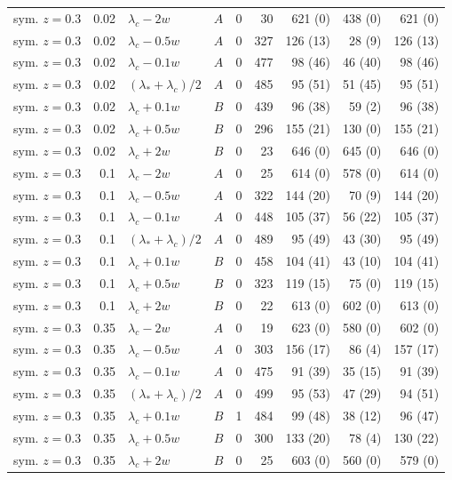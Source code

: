 \begin{longtable}{@{}lrllrrrrr@{}}
sym. $z{=}0.3$ & 0.02 & $\lambda_c-2w$ & $A$ & 0 & 30 & 621 (0) & 438 (0) & 621 (0)\\
sym. $z{=}0.3$ & 0.02 & $\lambda_c-0.5w$ & $A$ & 0 & 327 & 126 (13) & 28 (9) & 126 (13)\\
sym. $z{=}0.3$ & 0.02 & $\lambda_c-0.1w$ & $A$ & 0 & 477 & 98 (46) & 46 (40) & 98 (46)\\
sym. $z{=}0.3$ & 0.02 & $(\lambda_*+\lambda_c)/2$ & $A$ & 0 & 485 & 95 (51) & 51 (45) & 95 (51)\\
sym. $z{=}0.3$ & 0.02 & $\lambda_c+0.1w$ & $B$ & 0 & 439 & 96 (38) & 59 (2) & 96 (38)\\
sym. $z{=}0.3$ & 0.02 & $\lambda_c+0.5w$ & $B$ & 0 & 296 & 155 (21) & 130 (0) & 155 (21)\\
sym. $z{=}0.3$ & 0.02 & $\lambda_c+2w$ & $B$ & 0 & 23 & 646 (0) & 645 (0) & 646 (0)\\
sym. $z{=}0.3$ & 0.1 & $\lambda_c-2w$ & $A$ & 0 & 25 & 614 (0) & 578 (0) & 614 (0)\\
sym. $z{=}0.3$ & 0.1 & $\lambda_c-0.5w$ & $A$ & 0 & 322 & 144 (20) & 70 (9) & 144 (20)\\
sym. $z{=}0.3$ & 0.1 & $\lambda_c-0.1w$ & $A$ & 0 & 448 & 105 (37) & 56 (22) & 105 (37)\\
sym. $z{=}0.3$ & 0.1 & $(\lambda_*+\lambda_c)/2$ & $A$ & 0 & 489 & 95 (49) & 43 (30) & 95 (49)\\
sym. $z{=}0.3$ & 0.1 & $\lambda_c+0.1w$ & $B$ & 0 & 458 & 104 (41) & 43 (10) & 104 (41)\\
sym. $z{=}0.3$ & 0.1 & $\lambda_c+0.5w$ & $B$ & 0 & 323 & 119 (15) & 75 (0) & 119 (15)\\
sym. $z{=}0.3$ & 0.1 & $\lambda_c+2w$ & $B$ & 0 & 22 & 613 (0) & 602 (0) & 613 (0)\\
sym. $z{=}0.3$ & 0.35 & $\lambda_c-2w$ & $A$ & 0 & 19 & 623 (0) & 580 (0) & 602 (0)\\
sym. $z{=}0.3$ & 0.35 & $\lambda_c-0.5w$ & $A$ & 0 & 303 & 156 (17) & 86 (4) & 157 (17)\\
sym. $z{=}0.3$ & 0.35 & $\lambda_c-0.1w$ & $A$ & 0 & 475 & 91 (39) & 35 (15) & 91 (39)\\
sym. $z{=}0.3$ & 0.35 & $(\lambda_*+\lambda_c)/2$ & $A$ & 0 & 499 & 95 (53) & 47 (29) & 94 (51)\\
sym. $z{=}0.3$ & 0.35 & $\lambda_c+0.1w$ & $B$ & 1 & 484 & 99 (48) & 38 (12) & 96 (47)\\
sym. $z{=}0.3$ & 0.35 & $\lambda_c+0.5w$ & $B$ & 0 & 300 & 133 (20) & 78 (4) & 130 (22)\\
sym. $z{=}0.3$ & 0.35 & $\lambda_c+2w$ & $B$ & 0 & 25 & 603 (0) & 560 (0) & 579 (0)\\

\end{longtable}
